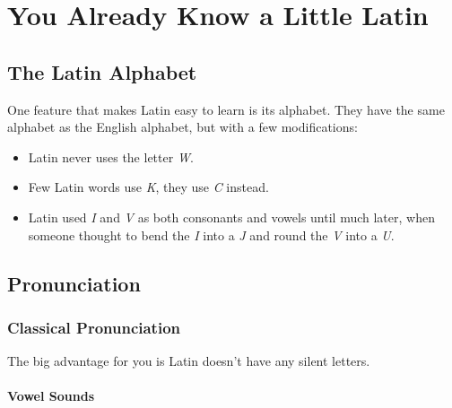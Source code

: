 \chapter{You Already Know a Little Latin}
\label{chap:you_already_know_a_little_latin}

\section{The Latin Alphabet}
\label{sec:the_latin_alphabet}

One feature that makes Latin easy to learn is its alphabet. They have the same
alphabet as the English alphabet, but with a few modifications:

\begin{itemize}
	\item Latin never uses the letter \textit{W}.
	\item Few Latin words use \textit{K}, they use \textit{C} instead.
	\item Latin used \textit{I} and \textit{V} as both consonants and vowels
	      until much later, when someone thought to bend the \textit{I} into a
	      \textit{J} and round the \textit{V} into a \textit{U}.
\end{itemize}


\section{Pronunciation}
\label{sub_sec:pronunciation}

\subsection{Classical Pronunciation}
\label{sub_sub_sec:classical_pronunciation}

The big advantage for you is Latin doesn't have any silent letters.

\subsubsection{Vowel Sounds}
\label{sub_sub_sec:vowel_sounds}

